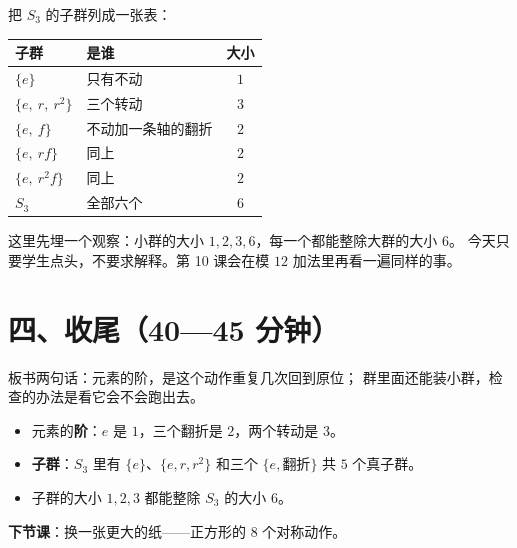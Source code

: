 把 \(S_3\) 的子群列成一张表：

\begin{center}
\begin{tabular}{@{}llc@{}}
  \toprule
  子群 & 是谁 & 大小 \\
  \midrule
  \(\{e\}\) & 只有不动 & \(1\) \\
  \(\{e,\ r,\ r^2\}\) & 三个转动 & \(3\) \\
  \(\{e,\ f\}\) & 不动加一条轴的翻折 & \(2\) \\
  \(\{e,\ rf\}\) & 同上 & \(2\) \\
  \(\{e,\ r^2f\}\) & 同上 & \(2\) \\
  \(S_3\) & 全部六个 & \(6\) \\
  \bottomrule
\end{tabular}
\end{center}

\begin{zhu}
  这里先埋一个观察：小群的大小 \(1,2,3,6\)，每一个都能整除大群的大小 \(6\)。
  今天只要学生点头，不要求解释。第 10 课会在模 \(12\) 加法里再看一遍同样的事。
\end{zhu}

\section*{四、收尾（40—45 分钟）}

板书两句话：元素的阶，是这个动作重复几次回到原位；
群里面还能装小群，检查的办法是看它会不会跑出去。

\begin{xiaojie}
  \begin{itemize}
    \item 元素的\textbf{阶}：\(e\) 是 \(1\)，三个翻折是 \(2\)，两个转动是 \(3\)。
    \item \textbf{子群}：\(S_3\) 里有 \(\{e\}\)、\(\{e,r,r^2\}\) 和三个 \(\{e,\text{翻折}\}\) 共 \(5\) 个真子群。
    \item 子群的大小 \(1,2,3\) 都能整除 \(S_3\) 的大小 \(6\)。
  \end{itemize}
\end{xiaojie}

\noindent\textbf{下节课}：换一张更大的纸——正方形的 \(8\) 个对称动作。